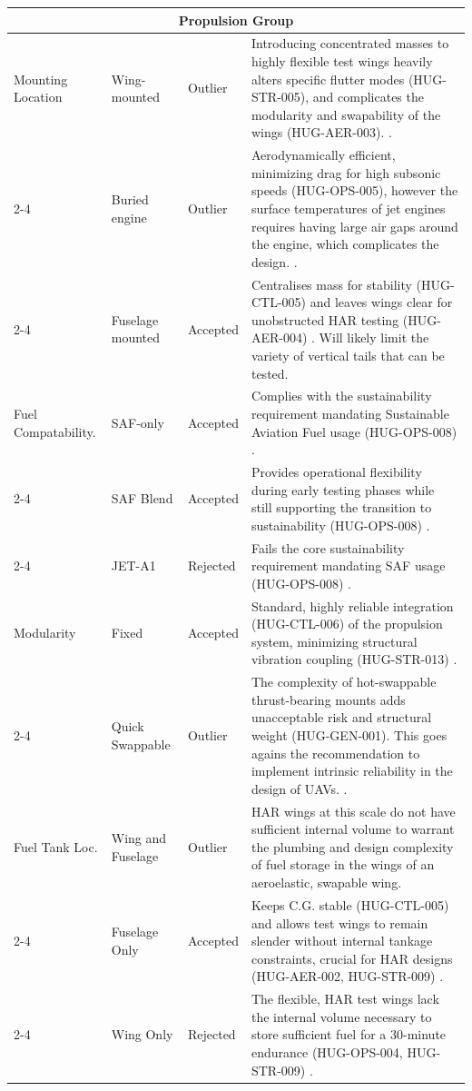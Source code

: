 \begin{longtable}{|p{1.6cm}|p{2.3cm}|p{1.6cm}|p{9.5cm}|}
\multicolumn{4}{|c|}{\textbf{Propulsion Group}} \\
\hline
Mounting Location & Wing-mounted & Outlier & Introducing concentrated masses to highly flexible test wings heavily alters specific flutter modes (HUG-STR-005), and complicates the modularity and swapability of the wings (HUG-AER-003). \cite{livne}. \\
\cline{2-4}
\multicolumn{1}{|l|}{} & Buried engine & Outlier & Aerodynamically efficient, minimizing drag for high subsonic speeds (HUG-OPS-005), however the surface temperatures of jet engines requires having large air gaps around the engine, which complicates the design. \cite{raymer1992aircraft, Shorter2021MicroTurbine}. \\
\cline{2-4}
\multicolumn{1}{|l|}{} & Fuselage mounted & Accepted & Centralises mass for stability (HUG-CTL-005) and leaves wings clear for unobstructed HAR testing (HUG-AER-004) \cite{Vos}. Will likely limit the variety of vertical tails that can be tested.\\
\hline
Fuel Compatability. & SAF-only & Accepted & Complies with the sustainability requirement mandating Sustainable Aviation Fuel usage (HUG-OPS-008) \cite{Wang2024}. \\
\cline{2-4}
\multicolumn{1}{|l|}{} & SAF Blend & Accepted & Provides operational flexibility during early testing phases while still supporting the transition to sustainability (HUG-OPS-008) \cite{Jarin2024, Kumar2025}. \\
\cline{2-4}
\multicolumn{1}{|l|}{} & JET-A1 & Rejected & Fails the core sustainability requirement mandating SAF usage (HUG-OPS-008) \cite{Wang2024}. \\
\hline
Modularity & Fixed & Accepted & Standard, highly reliable integration (HUG-CTL-006) of the propulsion system, minimizing structural vibration coupling (HUG-STR-013) \cite{Prakash2016DynamicFoundation, Alhazmi2025CoolingFanVibration}. \\
\cline{2-4}
\multicolumn{1}{|l|}{} & Quick Swappable & Outlier & The complexity of hot-swappable thrust-bearing mounts adds unacceptable risk and structural weight (HUG-GEN-001). This goes agains the recommendation to implement intrinsic reliability in the design of UAVs. \cite{Reliability_Unmanned_Aerial_Vehicles}. \\
\hline
Fuel Tank Loc. & Wing and Fuselage & Outlier & HAR wings at this scale do not have sufficient internal volume to warrant the plumbing and design complexity of fuel storage in the wings of an aeroelastic, swapable wing. \\
\cline{2-4}
\multicolumn{1}{|l|}{} & Fuselage Only & Accepted & Keeps C.G. stable (HUG-CTL-005) and allows test wings to remain slender without internal tankage constraints, crucial for HAR designs (HUG-AER-002, HUG-STR-009) \cite{Ma2024}. \\
\cline{2-4}
\multicolumn{1}{|l|}{} & Wing Only & Rejected & The flexible, HAR test wings lack the internal volume necessary to store sufficient fuel for a 30-minute endurance (HUG-OPS-004, HUG-STR-009) \cite{Ma2024}. \\
\hline


\end{longtable}
